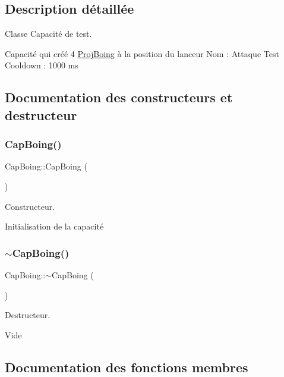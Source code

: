 \subsection{Description détaillée}
Classe Capacité de test. 

Capacité qui créé 4 \hyperlink{class_proj_boing}{Proj\+Boing} à la position du lanceur Nom \+: Attaque Test Cooldown \+: 1000 ms 

\subsection{Documentation des constructeurs et destructeur}
\mbox{\label{class_cap_boing_a56cc994661e49acc90ba77ac7380960d}} 
\subsubsection{\texorpdfstring{Cap\+Boing()}{CapBoing()}}
{\footnotesize\ttfamily Cap\+Boing\+::\+Cap\+Boing (\begin{DoxyParamCaption}{ }\end{DoxyParamCaption})}



Constructeur. 

Initialisation de la capacité \mbox{\label{class_cap_boing_a973a224dd449164c8840d8f8e86a10ff}} 
\subsubsection{\texorpdfstring{$\sim$\+Cap\+Boing()}{~CapBoing()}}
{\footnotesize\ttfamily Cap\+Boing\+::$\sim$\+Cap\+Boing (\begin{DoxyParamCaption}{ }\end{DoxyParamCaption})}



Destructeur. 

Vide 

\subsection{Documentation des fonctions membres}
\mbox{\label{class_cap_boing_a3d7900fcfc45344f7b584efb7f8c81b6}} 
